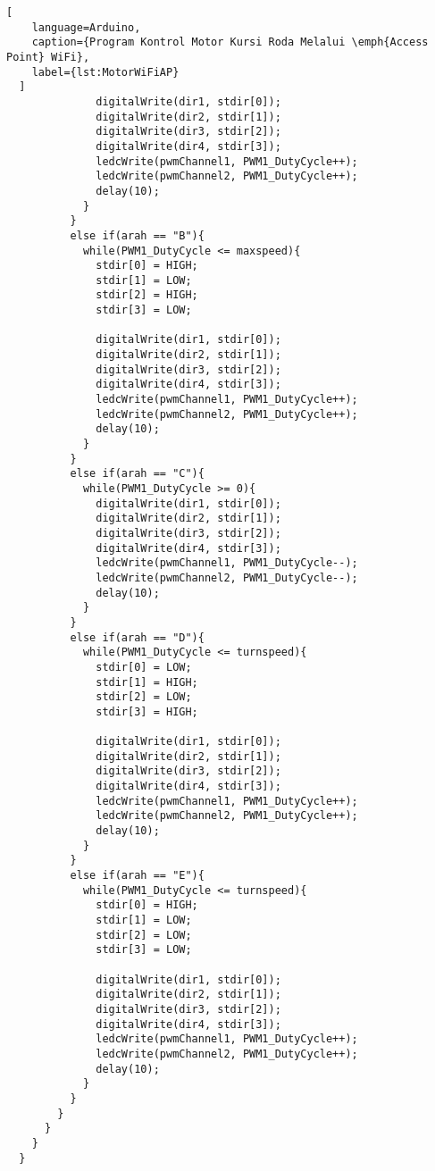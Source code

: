 \begin{lstlisting}[
    language=Arduino,
    caption={Program Kontrol Motor Kursi Roda Melalui \emph{Access Point} WiFi},
    label={lst:MotorWiFiAP}
  ]
              digitalWrite(dir1, stdir[0]);
              digitalWrite(dir2, stdir[1]);
              digitalWrite(dir3, stdir[2]);
              digitalWrite(dir4, stdir[3]);
              ledcWrite(pwmChannel1, PWM1_DutyCycle++);
              ledcWrite(pwmChannel2, PWM1_DutyCycle++);
              delay(10);
            }
          }
          else if(arah == "B"){
            while(PWM1_DutyCycle <= maxspeed){
              stdir[0] = HIGH;
              stdir[1] = LOW;
              stdir[2] = HIGH;
              stdir[3] = LOW;
  
              digitalWrite(dir1, stdir[0]);
              digitalWrite(dir2, stdir[1]);
              digitalWrite(dir3, stdir[2]);
              digitalWrite(dir4, stdir[3]);
              ledcWrite(pwmChannel1, PWM1_DutyCycle++);
              ledcWrite(pwmChannel2, PWM1_DutyCycle++);
              delay(10);
            }
          }
          else if(arah == "C"){
            while(PWM1_DutyCycle >= 0){
              digitalWrite(dir1, stdir[0]);
              digitalWrite(dir2, stdir[1]);
              digitalWrite(dir3, stdir[2]);
              digitalWrite(dir4, stdir[3]);
              ledcWrite(pwmChannel1, PWM1_DutyCycle--);
              ledcWrite(pwmChannel2, PWM1_DutyCycle--);
              delay(10);
            }
          }
          else if(arah == "D"){
            while(PWM1_DutyCycle <= turnspeed){
              stdir[0] = LOW;
              stdir[1] = HIGH;
              stdir[2] = LOW;
              stdir[3] = HIGH;
  
              digitalWrite(dir1, stdir[0]);
              digitalWrite(dir2, stdir[1]);
              digitalWrite(dir3, stdir[2]);
              digitalWrite(dir4, stdir[3]);
              ledcWrite(pwmChannel1, PWM1_DutyCycle++);
              ledcWrite(pwmChannel2, PWM1_DutyCycle++);
              delay(10);
            }
          }
          else if(arah == "E"){
            while(PWM1_DutyCycle <= turnspeed){
              stdir[0] = HIGH;
              stdir[1] = LOW;
              stdir[2] = LOW;
              stdir[3] = LOW;
  
              digitalWrite(dir1, stdir[0]);
              digitalWrite(dir2, stdir[1]);
              digitalWrite(dir3, stdir[2]);
              digitalWrite(dir4, stdir[3]);
              ledcWrite(pwmChannel1, PWM1_DutyCycle++);
              ledcWrite(pwmChannel2, PWM1_DutyCycle++);
              delay(10);
            }
          }
        }
      }
    }
  }  
  \end{lstlisting}

